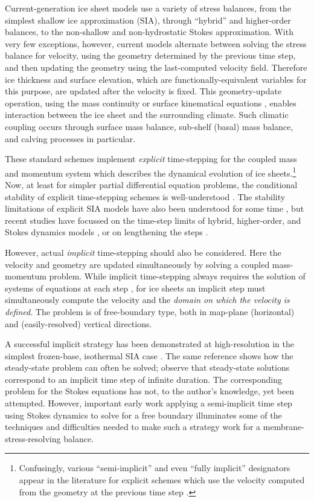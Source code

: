 \documentclass[twocolumn,letterpaper]{igs}
\begin{document}
Current-generation ice sheet models use a variety of stress balances, from the simplest shallow ice approximation (SIA), through ``hybrid'' \citep{Robinsonetal2022,Winkelmannetal2011} and higher-order balances, to the non-shallow and non-hydrostatic Stokes approximation.  With very few exceptions, however, current models alternate between solving the stress balance for velocity, using the geometry determined by the previous time step, and then updating the geometry using the last-computed velocity field.  Therefore ice thickness and surface elevation, which are functionally-equivalent variables for this purpose, are updated after the velocity is fixed.  This geometry-update operation, using the mass continuity or surface kinematical equations \citep{GreveBlatter2009}, enables interaction between the ice sheet and the surrounding climate.  Such climatic coupling occurs through surface mass balance, sub-shelf (basal) mass balance, and calving processes in particular.

These standard schemes implement \emph{explicit} time-stepping for the coupled mass and momentum system which describes the dynamical evolution of ice sheets.\footnote{Confusingly, various ``semi-implicit'' and even ``fully implicit'' designators appear in the literature for explicit schemes which use the velocity computed from the geometry at the previous time step \citep[for example]{Chengetal2017}.}  Now, at least for simpler partial differential equation problems, the conditional stability of explicit time-stepping schemes is well-understood \citep{LeVeque2007}.  The stability limitations of explicit SIA models have also been understood for some time \citep{HindmarshPayne1996}, but recent studies have focussed on the time-step limits of hybrid, higher-order, and Stokes dynamics models \citep{Chengetal2017,Robinsonetal2022}, or on lengthening the steps \citep{LofgrenAhlkronaHelanow2021}.

However, actual \emph{implicit} time-stepping should also be considered.  Here the velocity and geometry are updated simultaneously by solving a coupled mass-momentum problem.  While implicit time-stepping always requires the solution of systems of equations at each step \citep{LeVeque2007}, for ice sheets an implicit step must simultaneously compute the velocity and the \emph{domain on which the velocity is defined}.  The problem is of free-boundary type, both in map-plane (horizontal) \citep{SchoofHewitt2013} and (easily-resolved) vertical directions.

A successful implicit strategy has been demonstrated at high-resolution in the simplest frozen-base, isothermal SIA case \citep{Bueler2016}.  The same reference shows how the steady-state problem \citep[see][for example]{JouvetBueler2012} can often be solved; observe that steady-state solutions correspond to an implicit time step of infinite duration.  The corresponding problem for the Stokes equations has not, to the author's knowledge, yet been attempted.  However, important early work applying a semi-implicit time step using Stokes dynamics \citep{WirbelJarosch2020} to solve for a free boundary illuminates some of the techniques and difficulties needed to make such a strategy work for a membrane-stress-resolving balance.
\end{document}
